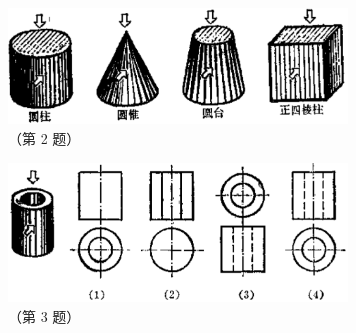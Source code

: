 \begin{lianxi}



\begin{figure}[htbp]
    \centering
    \includegraphics[width=9cm]{../pic/czjh2-ch8-subsec2-lx-02.png}
    \caption*{（第 2 题）}
\end{figure}


\begin{figure}[htbp]
    \centering
    \includegraphics[width=9cm]{../pic/czjh2-ch8-subsec2-lx-03.png}
    \caption*{（第 3 题）}
\end{figure}

\end{lianxi}

